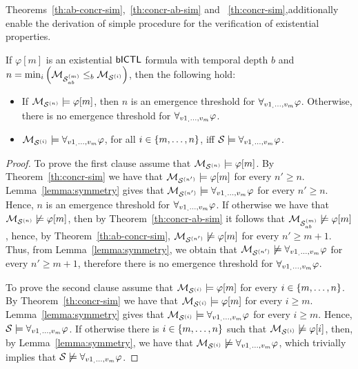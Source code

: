 Theorems~\ref{th:ab-concr-sim},~\ref{th:concr-ab-sim} and
~\ref{th:concr-sim},additionally enable the derivation of  simple procedure
for the verification of existential properties.

\begin{corollary}
\label{cor:existential}
If $\varphi[m]$ is an existential $\sf{bICTL}$ formula with temporal depth $b$ and  $n
= \min_i \left( \mathcal{M}_{\mathcal{S}_{ab}^{(m)}} \leq_b \mathcal{M}_{\mathcal{S}^{(i)}} \right)$, then the following hold:
\begin{itemize}
\item If $\mathcal{M}_{\mathcal{S}^{(n)}} \models \varphi[m]$, then $n$ is an emergence threshold for
$\forall_{v1_,\ldots,v_m} \varphi$. Otherwise, there is no emergence threshold for $\forall_{v1_,\ldots,v_m} \varphi$.

\item $\mathcal{M}_{\mathcal{S}^{(i)}} \models \forall_{v1_,\ldots,v_m} \varphi$, for all $i \in \left \{ m, \ldots, n \right \}$, iff
$\mathcal S \models \forall_{v1_,\ldots,v_m} \varphi$.
\end{itemize}
\end{corollary}
\begin{proof}
To prove the first clause assume that $\mathcal{M}_{\mathcal{S}^{(n)}} \models \varphi[m]$. By
Theorem~\ref{th:concr-sim} we have that $\mathcal{M}_{\mathcal{S}^{(n')}} \models \varphi[m]$ for every
$n' \geq n$. Lemma~\ref{lemma:symmetry} gives that  $\mathcal{M}_{\mathcal{S}^{(n')}} \models
\forall_{v1_,\ldots,v_m} \varphi$ for every $n' \geq n$. Hence, $n$ is an emergence threshold for
$\forall_{v1_,\ldots,v_m} \varphi$. If otherwise we have that  $\mathcal{M}_{\mathcal{S}^{(n)}} \not \models \varphi[m]$, then
by Theorem~\ref{th:concr-ab-sim} it follows  that $\mathcal{M}_{\mathcal{S}_{ab}^{(m)}} \not \models
\varphi[m]$, hence, by Theorem~\ref{th:ab-concr-sim}, $\mathcal{M}_{\mathcal{S}^{(n')}} \not \models
\varphi[m]$ for every $n' \geq m+1$.  Thus, from Lemma~\ref{lemma:symmetry}, we
obtain that $\mathcal{M}_{\mathcal{S}^{(n')}} \not \models \forall_{v1_,\ldots,v_m} \varphi$ for every $n' \geq m + 1$,
therefore there is no emergence threshold for $\forall_{v1_,\ldots,v_m} \varphi$.

To prove the second clause assume that $\mathcal{M}_{\mathcal{S}^{(i)}} \models \varphi[m]$ for every $i
\in \left \{ m,\ldots,n \right \}$.  By Theorem~\ref{th:concr-sim} we have that $\mathcal{M}_{\mathcal{S}^{(i)}}
\models \varphi[m]$ for every $i \geq m$. Lemma~\ref{lemma:symmetry} gives that
$\mathcal{M}_{\mathcal{S}^{(i)}} \models \forall_{v1_,\ldots,v_m} \varphi$ for every $i \geq m$. Hence, $\mathcal S \models
\forall_{v1_,\ldots,v_m} \varphi$.  If otherwise there is $i \in \left \{ m, \ldots, n \right \}$ such that $\mathcal{M}_{\mathcal{S}^{(i)}} \not \models \varphi[i]$, then, by Lemma~\ref{lemma:symmetry}, we have that
$\mathcal{M}_{\mathcal{S}^{(i)}} \not \models \forall_{v1_,\ldots,v_m} \varphi$, which trivially implies that $\mathcal S \not
\models \forall_{v1_,\ldots,v_m} \varphi$.
\end{proof}

